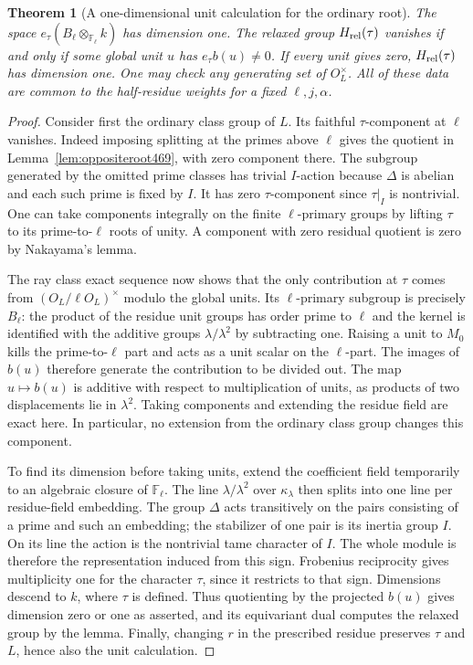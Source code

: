 \documentclass[a4paper,11pt]{article}
\newtheorem{theorem}[proposition]{Theorem}
\theoremstyle{definition}
\theoremstyle{remark}
\numberwithin{equation}{section}
\begin{document}
\begin{theorem}[A one-dimensional unit calculation for the ordinary root]\leavevmode
\label{thm:unitray472}
The space \(e_\tau(B_\ell\otimes_{\mathbb F_\ell}k)\) has
dimension one. The relaxed group \(H_{\rm rel}(\tau)\) vanishes
if and only if some global unit \(u\) has \(e_\tau b(u)\ne0\).
If every unit gives zero, \(H_{\rm rel}(\tau)\) has dimension one.
One may check any generating set of \(O_L^\times\). All of these
data are common to the half-residue weights for a fixed
\(\ell,j,\alpha\).
\end{theorem}
\begin{proof}
Consider first the ordinary class group of \(L\). Its faithful
\(\tau\)-component at \(\ell\) vanishes. Indeed imposing splitting
at the primes above \(\ell\) gives the quotient in
Lemma~\ref{lem:oppositeroot469}, with zero component there.
The subgroup generated by the omitted prime classes has trivial
\(I\)-action because \(\Delta\) is abelian and each such prime
is fixed by \(I\). It has zero \(\tau\)-component since \(\tau|_I\)
is nontrivial. One can take components integrally on the finite
\(\ell\)-primary groups by lifting \(\tau\) to its prime-to-\(\ell\)
roots of unity. A component with zero residual quotient is zero
by Nakayama's lemma.

The ray class exact sequence now shows that the only contribution
at \(\tau\) comes from \((O_L/\ell O_L)^\times\) modulo the global
units. Its \(\ell\)-primary subgroup is precisely \(B_\ell\):
the product of the residue unit groups has order prime to \(\ell\)
and the kernel is identified with the additive groups
\(\lambda/\lambda^2\) by subtracting one. Raising a unit to
\(M_0\) kills the prime-to-\(\ell\) part and acts as a unit scalar
on the \(\ell\)-part. The images of \(b(u)\) therefore generate
the contribution to be divided out. The map \(u\mapsto b(u)\)
is additive with respect to multiplication of units, as products
of two displacements lie in \(\lambda^2\). Taking components and
extending the residue field are exact here. In particular, no
extension from the ordinary class group changes this component.

To find its dimension before taking units, extend the coefficient
field temporarily to an algebraic closure of \(\mathbb F_\ell\).
The line \(\lambda/\lambda^2\) over \(\kappa_\lambda\) then splits
into one line per residue-field embedding. The group \(\Delta\)
acts transitively on the pairs consisting of a prime and such an
embedding; the stabilizer of one pair is its inertia group \(I\).
On its line the action is the nontrivial tame character of \(I\).
The whole module is therefore the representation induced from
this sign. Frobenius reciprocity gives multiplicity one for the
character \(\tau\), since it restricts to that sign. Dimensions
descend to \(k\), where \(\tau\) is defined. Thus quotienting by
the projected \(b(u)\) gives dimension zero or one as asserted,
and its equivariant dual computes the relaxed group by the lemma.
Finally, changing \(r\) in the prescribed residue preserves \(\tau\)
and \(L\), hence also the unit calculation.
\end{proof}
\end{document}
